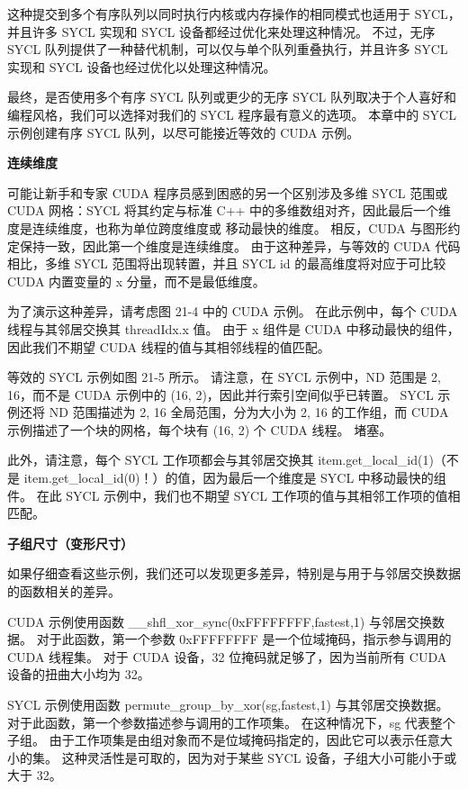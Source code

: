 这种提交到多个有序队列以同时执行内核或内存操作的相同模式也适用于 SYCL，并且许多 SYCL 实现和 SYCL 设备都经过优化来处理这种情况。 不过，无序 SYCL 队列提供了一种替代机制，可以仅与单个队列重叠执行，并且许多 SYCL 实现和 SYCL 设备也经过优化以处理这种情况。

最终，是否使用多个有序 SYCL 队列或更少的无序 SYCL 队列取决于个人喜好和编程风格，我们可以选择对我们的 SYCL 程序最有意义的选项。 本章中的 SYCL 示例创建有序 SYCL 队列，以尽可能接近等效的 CUDA 示例。

\textbf{连续维度}

可能让新手和专家 CUDA 程序员感到困惑的另一个区别涉及多维 SYCL 范围或 CUDA 网格：SYCL 将其约定与标准 C++ 中的多维数组对齐，因此最后一个维度是连续维度，也称为单位跨度维度或 移动最快的维度。 相反，CUDA 与图形约定保持一致，因此第一个维度是连续维度。 由于这种差异，与等效的 CUDA 代码相比，多维 SYCL 范围将出现转置，并且 SYCL id 的最高维度将对应于可比较 CUDA 内置变量的 x 分量，而不是最低维度。

为了演示这种差异，请考虑图 21-4 中的 CUDA 示例。 在此示例中，每个 CUDA 线程与其邻居交换其 threadIdx.x 值。 由于 x 组件是 CUDA 中移动最快的组件，因此我们不期望 CUDA 线程的值与其相邻线程的值匹配。

等效的 SYCL 示例如图 21-5 所示。 请注意，在 SYCL 示例中，ND 范围是 {2, 16}，而不是 CUDA 示例中的 (16, 2)，因此并行索引空间似乎已转置。 SYCL 示例还将 ND 范围描述为 {2, 16} 全局范围，分为大小为 {2, 16} 的工作组，而 CUDA 示例描述了一个块的网格，每个块有 (16, 2) 个 CUDA 线程。 堵塞。

此外，请注意，每个 SYCL 工作项都会与其邻居交换其 item.get\_local\_id(1)（不是 item.get\_local\_id(0)！）的值，因为最后一个维度是 SYCL 中移动最快的组件。 在此 SYCL 示例中，我们也不期望 SYCL 工作项的值与其相邻工作项的值相匹配。

\textbf{子组尺寸（变形尺寸）}

如果仔细查看这些示例，我们还可以发现更多差异，特别是与用于与邻居交换数据的函数相关的差异。

CUDA 示例使用函数 \_\_shfl\_xor\_sync(0xFFFFFFFF,fastest,1) 与邻居交换数据。 对于此函数，第一个参数 0xFFFFFFFF 是一个位域掩码，指示参与调用的 CUDA 线程集。 对于 CUDA 设备，32 位掩码就足够了，因为当前所有 CUDA 设备的扭曲大小均为 32。

SYCL 示例使用函数 permute\_group\_by\_xor(sg,fastest,1) 与其邻居交换数据。 对于此函数，第一个参数描述参与调用的工作项集。 在这种情况下，sg 代表整个子组。 由于工作项集是由组对象而不是位域掩码指定的，因此它可以表示任意大小的集。 这种灵活性是可取的，因为对于某些 SYCL 设备，子组大小可能小于或大于 32。

